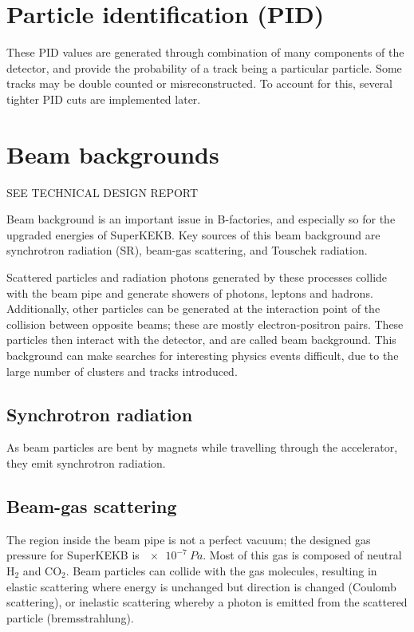 \documentclass[12pt]{thesis}  %
\begin{document}
\section{Particle identification (PID)}

These PID values are generated through combination of many components of the detector, and provide the probability of a track being a particular particle. Some tracks may be double counted or misreconstructed. To account for this, several tighter PID cuts are implemented later.


\section{Beam backgrounds}

SEE TECHNICAL DESIGN REPORT

Beam background is an important issue in B-factories, and especially so for the upgraded energies of SuperKEKB. Key sources of this beam background are synchrotron radiation (SR), beam-gas scattering, and Touschek radiation.

Scattered particles and radiation photons generated by these processes collide with the beam pipe and generate showers of photons, leptons and hadrons. Additionally, other particles can be generated at the interaction point of the collision between opposite beams; these are mostly electron-positron pairs. These particles then interact with the detector, and are called beam background. This background can make searches for interesting physics events difficult, due to the large number of clusters and tracks introduced.

\subsection{Synchrotron radiation}

As beam particles are bent by magnets while travelling through the accelerator, they emit synchrotron radiation.

\subsection{Beam-gas scattering}	

The region inside the beam pipe is not a perfect vacuum; the designed gas pressure for SuperKEKB is $\SI{e-7}{Pa}$. Most of this gas is composed of neutral H$_2$ and CO$_2$. Beam particles can collide with the gas molecules, resulting in elastic scattering where energy is unchanged but direction is changed (Coulomb scattering), or inelastic scattering whereby a photon is emitted from the scattered particle (bremsstrahlung).
\end{document}
